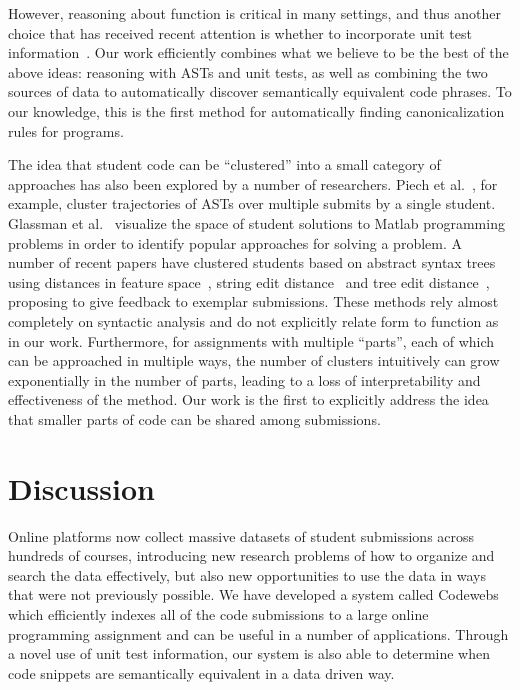 However, reasoning about function is critical in many settings, and thus
another choice that has received recent attention is whether to incorporate 
unit test information~\cite{hummel08,lazzarini09}.  
Our work efficiently combines what we believe to be the best of the above ideas: reasoning with ASTs and unit tests, as well as combining the
two sources of data to automatically discover semantically equivalent code phrases.  To our knowledge, this is
the first method for automatically finding canonicalization rules for programs.


The idea that student code can be ``clustered'' into a small category of approaches has also been explored by a number of researchers.
Piech et al.~\cite{piech12}, for example, cluster trajectories of ASTs over multiple submits by a single student.  
Glassman et al.~\cite{glassman13} visualize the space of student solutions to Matlab programming problems in order to identify popular approaches for
solving a problem.
A number of recent papers have clustered students based on abstract syntax trees using distances in feature 
space~\cite{gross12,gross13}, string edit distance~\cite{rivers12,rivers13}
and tree edit distance~\cite{huang13}, proposing to give feedback to exemplar submissions.	
These methods rely almost completely on syntactic analysis and do not 
explicitly relate form to function as in our work. Furthermore, for assignments with multiple ``parts'', each of which can be approached in multiple ways, 
the number of clusters intuitively can grow exponentially in the number of parts, leading to a loss of interpretability and effectiveness of the method.
Our work is the first to explicitly address the idea that smaller parts of code can be shared among submissions.

\section{Discussion}\label{sec:discussion}
Online platforms now collect massive datasets of student submissions across hundreds of courses, 
introducing new research problems of how to organize and search the data 
effectively, but also new opportunities to use the data in ways that were not previously possible.
We have developed a system called Codewebs which efficiently indexes all of the code submissions to a 
large online programming assignment and can be useful in a number of applications.  
Through a novel use of unit test information, our system is also able to determine 
when code snippets are semantically equivalent in a data driven way.

